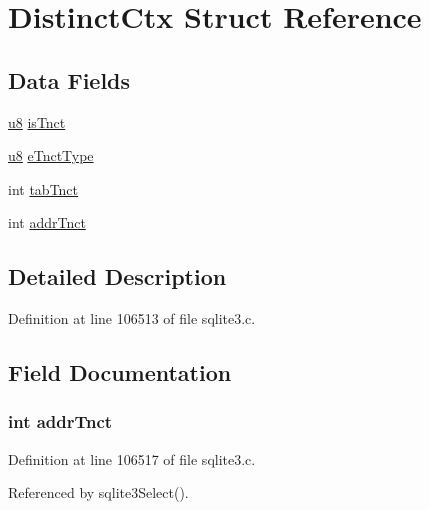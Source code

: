 \hypertarget{struct_distinct_ctx}{}\section{Distinct\+Ctx Struct Reference}
\label{struct_distinct_ctx}
\subsection*{Data Fields}
\begin{DoxyCompactItemize}
\item 
\hyperlink{sqlite3_8c_a74a0f6424ae628af25f23f0a35f6ead3}{u8} \hyperlink{struct_distinct_ctx_a93b6b04a410193e5e5060a7c67ebddcc}{is\+Tnct}
\item 
\hyperlink{sqlite3_8c_a74a0f6424ae628af25f23f0a35f6ead3}{u8} \hyperlink{struct_distinct_ctx_a8adafa81d3bc292d68ffdf215e0faf3d}{e\+Tnct\+Type}
\item 
int \hyperlink{struct_distinct_ctx_a25dcb2aebcd55046aef6458b549f2d5c}{tab\+Tnct}
\item 
int \hyperlink{struct_distinct_ctx_a72e5fdb09011d7e854da8e6ab9052e76}{addr\+Tnct}
\end{DoxyCompactItemize}


\subsection{Detailed Description}


Definition at line 106513 of file sqlite3.\+c.



\subsection{Field Documentation}
\hypertarget{struct_distinct_ctx_a72e5fdb09011d7e854da8e6ab9052e76}{}
\subsubsection[{addr\+Tnct}]{\setlength{\rightskip}{0pt plus 5cm}int addr\+Tnct}\label{struct_distinct_ctx_a72e5fdb09011d7e854da8e6ab9052e76}


Definition at line 106517 of file sqlite3.\+c.



Referenced by sqlite3\+Select().

\hypertarget{struct_distinct_ctx_a8adafa81d3bc292d68ffdf215e0faf3d}{}
